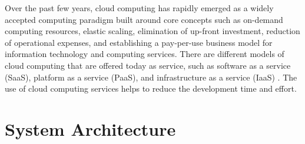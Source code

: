 \documentclass{frontiersSCNS} %
\begin{document}
Over the past few years, cloud computing has rapidly emerged as a widely
accepted computing paradigm built around core concepts such as on-demand
computing resources, elastic scaling, elimination of up-front investment,
reduction of operational expenses, and establishing a pay-per-use business
model for information technology and computing services. There are different
models of cloud computing that are offered today as service, such as software
as a service (SaaS), platform as a service (PaaS), and infrastructure as a
service (IaaS) \citep{Mell2011, Azodolmolky2013}. The use of cloud computing
services helps to reduce the development time and effort.

\section{System Architecture}
\end{document}
